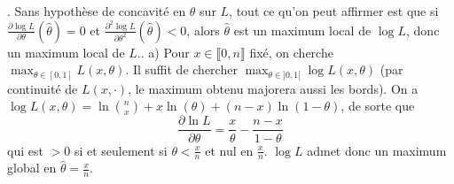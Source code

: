 \documentclass{report}
\begin{document}
\subsection{} \noindent{}\\ 
\\ 
\\
. Sans hypothèse de concavité en $\theta$ sur $L$, tout ce qu'on peut affirmer est que si $\frac{\partial \log L}{\partial \theta}(\hat \theta)=0$ et $\frac{\partial^2 \log L}{\partial \theta^2}(\hat \theta)<0$, alors $\hat \theta$ est un maximum local de $\log L$, donc un maximum local de $L$.. a) Pour $x\in \llbracket 0,n\rrbracket$ fixé, on cherche $\max_{\theta \in [0,1]}L(x,\theta)$. Il suffit de chercher $\max_{\theta \in ]0,1[}\log L(x,\theta)$ (par continuité de $L(x,\cdot)$, le maximum obtenu majorera aussi les bords).\newline
On a $\log L(x,\theta)=\ln\binom{n}{x} + x\ln(\theta) + (n-x)\ln(1-\theta)$, de sorte que $$\frac{\partial\ln L}{\partial \theta}=\frac{x}{\theta}- \frac{n-x}{1-\theta}$$
qui est $>0$ si et seulement si $\theta < \frac{x}{n}$ et nul en $\frac{x}{n}$. $\log L$ admet donc un maximum global en $\hat \theta=\frac{x}{n}$. \newline
\end{document}
